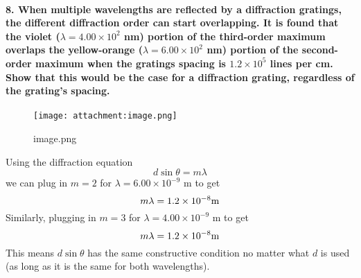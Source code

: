 \documentclass[11pt]{article}
\makeatletter
\def\maxwidth{\ifdim\Gin@nat@width>\linewidth\linewidth
    \else\Gin@nat@width\fi}
\let\Oldincludegraphics\includegraphics
\renewcommand{\includegraphics}[1]{\Oldincludegraphics[width=.8\maxwidth]{#1}}
\makeatother
\begin{document}
    \paragraph{\texorpdfstring{8. When multiple wavelengths are reflected by
a diffraction gratings, the different diffraction order can start
overlapping. It is found that the violet (\(\lambda=4.00\times 10^2\)
nm) portion of the third-order maximum overlaps the yellow-orange
(\(\lambda=6.00\times10^2\) nm) portion of the second-order maximum when
the gratings spacing is \(1.2\times10^5\) lines per cm. Show that this
would be the case for a diffraction grating, regardless of the grating's
spacing.}{8. When multiple wavelengths are reflected by a diffraction gratings, the different diffraction order can start overlapping. It is found that the violet (\textbackslash{}lambda=4.00\textbackslash{}times 10\^{}2 nm) portion of the third-order maximum overlaps the yellow-orange (\textbackslash{}lambda=6.00\textbackslash{}times10\^{}2 nm) portion of the second-order maximum when the gratings spacing is 1.2\textbackslash{}times10\^{}5 lines per cm. Show that this would be the case for a diffraction grating, regardless of the grating's spacing.}}\label{when-multiple-wavelengths-are-reflected-by-a-diffraction-gratings-the-different-diffraction-order-can-start-overlapping.-it-is-found-that-the-violet-lambda4.00times-102-nm-portion-of-the-third-order-maximum-overlaps-the-yellow-orange-lambda6.00times102-nm-portion-of-the-second-order-maximum-when-the-gratings-spacing-is-1.2times105-lines-per-cm.-show-that-this-would-be-the-case-for-a-diffraction-grating-regardless-of-the-gratings-spacing.}

\begin{figure}[htbp]
\centering
\texttt{[image: attachment:image.png]}
\caption{image.png}
\end{figure}

Using the diffraction equation \[d \sin\theta = m\lambda\] we can plug
in \(m = 2\) for \(\lambda=6.00\times10^{-9}\) m to get
\[m\lambda = 1.2\times10^{-8} \rm{m}\] Similarly, plugging in \(m = 3\)
for \(\lambda=4.00\times10^{-9}\) m to get
\[m\lambda = 1.2\times10^{-8} \rm{m}\] This means \(d\sin\theta\) has
the same constructive condition no matter what \(d\) is used (as long as
it is the same for both wavelengths).
\end{document}

